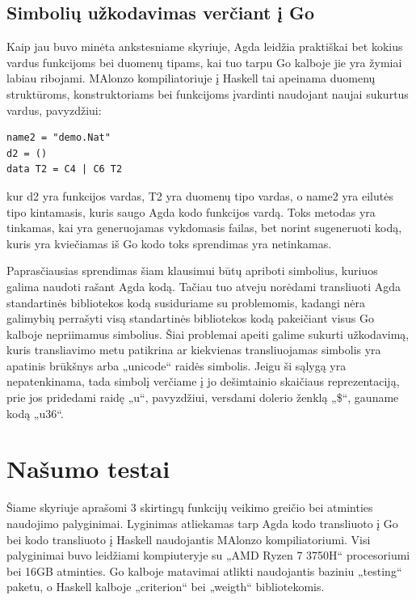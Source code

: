 \documentclass{VUMIFPSkursinis}
\begin{document}
\subsection{Simbolių užkodavimas verčiant į Go}
Kaip jau buvo minėta ankstesniame skyriuje, Agda leidžia praktiškai bet kokius vardus funkcijoms bei duomenų tipams, kai tuo tarpu Go kalboje jie yra žymiai labiau ribojami. MAlonzo kompiliatoriuje į Haskell tai apeinama duomenų struktūroms, konstruktoriams bei funkcijoms įvardinti naudojant naujai sukurtus vardus, pavyzdžiui:
\begin{lstlisting}
name2 = "demo.Nat"
d2 = ()
data T2 = C4 | C6 T2
\end{lstlisting}
kur d2 yra funkcijos vardas, T2 yra duomenų tipo vardas, o name2 yra eilutės tipo kintamasis, kuris saugo Agda kodo funkcijos vardą. Toks metodas yra tinkamas, kai yra generuojamas vykdomasis failas, bet norint sugeneruoti kodą, kuris yra kviečiamas iš Go kodo toks sprendimas yra netinkamas. \par Paprasčiausias sprendimas šiam klausimui būtų apriboti simbolius, kuriuos galima naudoti rašant Agda kodą. Tačiau tuo atveju norėdami transliuoti Agda standartinės bibliotekos kodą susiduriame su problemomis, kadangi nėra galimybių perrašyti visą standartinės bibliotekos kodą pakeičiant visus Go kalboje nepriimamus simbolius. Šiai problemai apeiti galime sukurti užkodavimą, kuris transliavimo metu patikrina ar kiekvienas transliuojamas simbolis yra apatinis brūkšnys arba „unicode“ raidės simbolis. Jeigu ši sąlygą yra nepatenkinama, tada simbolį verčiame į jo dešimtainio skaičiaus reprezentaciją, prie jos pridedami raidę „u“, pavyzdžiui, versdami dolerio ženklą „\$“, gauname kodą „u36“.
\section{Našumo testai}
Šiame skyriuje aprašomi 3 skirtingų funkcijų veikimo greičio bei atminties naudojimo palyginimai. Lyginimas atliekamas tarp Agda kodo transliuoto į Go bei kodo transliuoto į Haskell naudojantis MAlonzo kompiliatoriumi. Visi palyginimai buvo leidžiami kompiuteryje su  „AMD Ryzen 7 3750H“ procesoriumi bei 16GB atminties. Go kalboje matavimai atlikti naudojantis baziniu „testing“ paketu, o Haskell kalboje „criterion“ bei „weigth“ bibliotekomis. 
\end{document}
